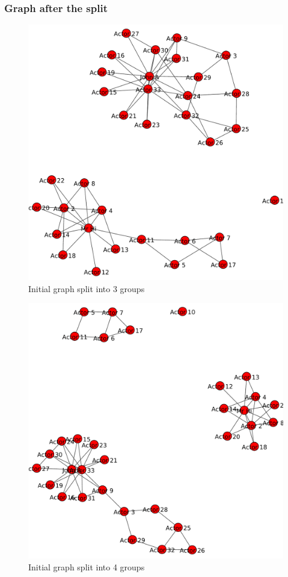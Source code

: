 \documentclass[12pt]{article}
\begin{document}
\subsubsection{Graph after the split}
\begin{figure}[ht]
\includegraphics[scale=0.7]{../Q2/graph4.pdf}
\centering
\caption{Initial graph split into 3 groups}
\label{Initial graph split into 3 groups}
\end{figure}
\newpage

\begin{figure}[ht]
\includegraphics[scale=0.7]{../Q2/graph5.pdf}
\centering
\caption{Initial graph split into 4 groups}
\label{Initial graph split into 4 groups}
\end{figure}
\newpage
\end{document}
